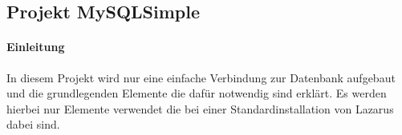 \subsection{Projekt MySQLSimple}
\paragraph{Einleitung}
In diesem Projekt wird nur eine einfache Verbindung zur Datenbank aufgebaut und die grundlegenden Elemente die dafür notwendig sind erklärt. Es werden hierbei nur Elemente verwendet die bei einer Standardinstallation von Lazarus dabei sind.


